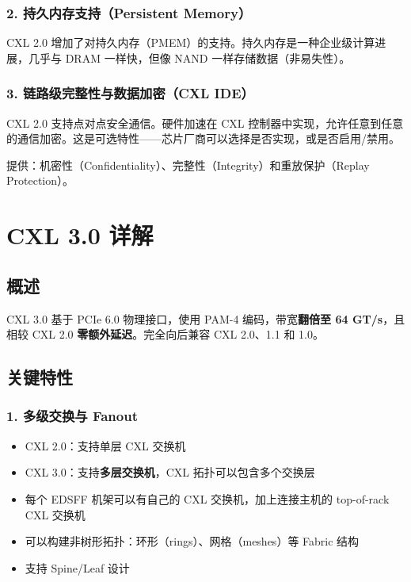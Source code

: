 \documentclass[12pt,a4paper]{article}
\begin{document}
\subsubsection{2. 持久内存支持（Persistent Memory）}

CXL 2.0 增加了对持久内存（PMEM）的支持。持久内存是一种企业级计算进展，几乎与 DRAM 一样快，但像 NAND 一样存储数据（非易失性）。

\subsubsection{3. 链路级完整性与数据加密（CXL IDE）}

\begin{keypoint}[安全增强]
CXL 2.0 支持点对点安全通信。硬件加速在 CXL 控制器中实现，允许任意到任意的通信加密。这是可选特性——芯片厂商可以选择是否实现，或是否启用/禁用。

提供：机密性（Confidentiality）、完整性（Integrity）和重放保护（Replay Protection）。
\end{keypoint}

\section{CXL 3.0 详解}

\subsection{概述}

CXL 3.0 基于 PCIe 6.0 物理接口，使用 PAM-4 编码，带宽\textbf{翻倍至 64 GT/s}，且相较 CXL 2.0 \textbf{零额外延迟}。完全向后兼容 CXL 2.0、1.1 和 1.0。

\subsection{关键特性}

\subsubsection{1. 多级交换与 Fanout}

\begin{keypoint}[交换增强]
\begin{itemize}
    \item CXL 2.0：支持单层 CXL 交换机
    \item CXL 3.0：支持\textbf{多层交换机}，CXL 拓扑可以包含多个交换层
    \item 每个 EDSFF 机架可以有自己的 CXL 交换机，加上连接主机的 top-of-rack CXL 交换机
    \item 可以构建非树形拓扑：环形（rings）、网格（meshes）等 Fabric 结构
    \item 支持 Spine/Leaf 设计
\end{itemize}
\end{keypoint}
\end{document}

